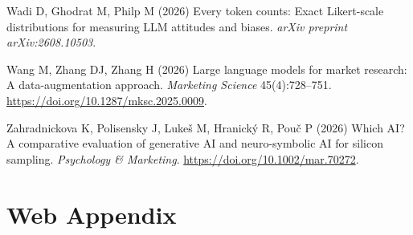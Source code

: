\documentclass[
  letterpaper,
  DIV=11,
  numbers=noendperiod]{scrartcl}
\newlength{\cslhangindent}
\newenvironment{CSLReferences}[2] %
 {\begin{list}{}{%
  \setlength{\itemindent}{0pt}
  \setlength{\leftmargin}{0pt}
  \setlength{\parsep}{0pt}
  \ifodd #1
   \setlength{\leftmargin}{\cslhangindent}
   \setlength{\itemindent}{-1\cslhangindent}
  \fi
  \setlength{\itemsep}{#2\baselineskip}}}
 {\end{list}}
\begin{document}
\begin{CSLReferences}{1}{0}
Wadi D, Ghodrat M, Philp M (2026) Every token counts: Exact
{Likert}-scale distributions for measuring LLM attitudes and biases.
\emph{arXiv preprint arXiv:2608.10503}.

Wang M, Zhang DJ, Zhang H (2026) Large language models for market
research: A data-augmentation approach. \emph{Marketing Science}
45(4):728--751. \url{https://doi.org/10.1287/mksc.2025.0009}.

Zahradnickova K, Polisensky J, Lukeš M, Hranický R, Pouč P (2026) Which
AI? A comparative evaluation of generative AI and neuro-symbolic AI for
silicon sampling. \emph{Psychology \& Marketing}.
\url{https://doi.org/10.1002/mar.70272}.

\end{CSLReferences}

\newpage{}

\section*{Web Appendix}\label{web-appendix}
\end{document}
